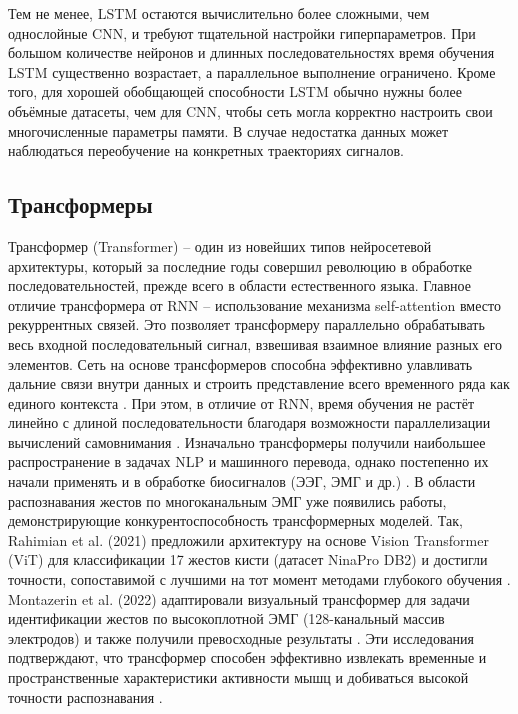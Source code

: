 \documentclass[12pt,a4paper]{article}
\begin{document}
Тем не менее, LSTM остаются вычислительно более сложными, чем однослойные CNN, и требуют тщательной настройки гиперпараметров. При большом количестве нейронов и длинных последовательностях время обучения LSTM существенно возрастает, а параллельное выполнение ограничено. Кроме того, для хорошей обобщающей способности LSTM обычно нужны более объёмные датасеты, чем для CNN, чтобы сеть могла корректно настроить свои многочисленные параметры памяти. В случае недостатка данных может наблюдаться переобучение на конкретных траекториях сигналов.

\subsection{Трансформеры}
Трансформер (Transformer) – один из новейших типов нейросетевой архитектуры, который за последние годы совершил революцию в обработке последовательностей, прежде всего в области естественного языка. Главное отличие трансформера от RNN – использование механизма self-attention вместо рекуррентных связей. Это позволяет трансформеру параллельно обрабатывать весь входной последовательный сигнал, взвешивая взаимное влияние разных его элементов. Сеть на основе трансформеров способна эффективно улавливать дальние связи внутри данных и строить представление всего временного ряда как единого контекста \cite{27}. При этом, в отличие от RNN, время обучения не растёт линейно с длиной последовательности благодаря возможности параллелизации вычислений самовнимания \cite{28}.
Изначально трансформеры получили наибольшее распространение в задачах NLP и машинного перевода, однако постепенно их начали применять и в обработке биосигналов (ЭЭГ, ЭМГ и др.) \cite{29}. В области распознавания жестов по многоканальным ЭМГ уже появились работы, демонстрирующие конкурентоспособность трансформерных моделей. Так, Rahimian et al. (2021) предложили архитектуру на основе Vision Transformer (ViT) для классификации 17 жестов кисти (датасет NinaPro DB2) и достигли точности, сопоставимой с лучшими на тот момент методами глубокого обучения \cite{30}. Montazerin et al. (2022) адаптировали визуальный трансформер для задачи идентификации жестов по высокоплотной ЭМГ (128-канальный массив электродов) и также получили превосходные результаты \cite{31}. Эти исследования подтверждают, что трансформер способен эффективно извлекать временные и пространственные характеристики активности мышц и добиваться высокой точности распознавания \cite{32}.
\end{document}
